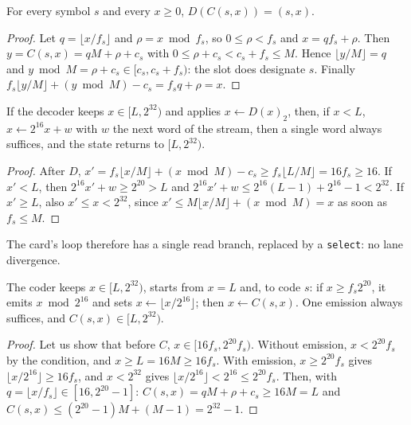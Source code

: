 \begin{lemme}[Inversion]\label{lem:rans-inversion}
For every symbol $s$ and every $x \ge 0$, $D(C(s,x)) = (s, x)$.
\end{lemme}

\begin{proof}
Let $q = \lfloor x/f_s \rfloor$ and $\rho = x \bmod f_s$, so $0 \le \rho < f_s$ and $x = q f_s + \rho$. Then $y = C(s,x) = qM + \rho + c_s$ with $0 \le \rho + c_s < c_s + f_s \le M$. Hence $\lfloor y/M \rfloor = q$ and $y \bmod M = \rho + c_s \in [c_s, c_s + f_s)$: the slot does designate $s$. Finally $f_s \lfloor y/M\rfloor + (y \bmod M) - c_s = f_s q + \rho = x$.
\end{proof}

\begin{lemme}\label{lem:rans-lecture}
If the decoder keeps $x \in [L, 2^{32})$ and applies $x \leftarrow D(x)_2$, then, if $x < L$, $x \leftarrow 2^{16} x + w$ with $w$ the next word of the stream, then a single word always suffices, and the state returns to $[L, 2^{32})$.
\end{lemme}

\begin{proof}
After $D$, $x' = f_s\lfloor x/M\rfloor + (x \bmod M) - c_s \ge f_s \lfloor L/M \rfloor = 16 f_s \ge 16$. If $x' < L$, then $2^{16}x' + w \ge 2^{20} > L$ and $2^{16} x' + w \le 2^{16}(L - 1) + 2^{16} - 1 < 2^{32}$. If $x' \ge L$, also $x' \le x < 2^{32}$, since $x' \le M\lfloor x/M\rfloor + (x \bmod M) = x$ as soon as $f_s \le M$.
\end{proof}

The card's loop therefore has a single read branch, replaced by a \texttt{select}: no lane divergence.

\begin{lemme}\label{lem:rans-codeur}
The coder keeps $x \in [L, 2^{32})$, starts from $x = L$ and, to code $s$: if $x \ge f_s 2^{20}$, it emits $x \bmod 2^{16}$ and sets $x \leftarrow \lfloor x/2^{16} \rfloor$; then $x \leftarrow C(s, x)$. One emission always suffices, and $C(s,x) \in [L, 2^{32})$.
\end{lemme}

\begin{proof}
Let us show that before $C$, $x \in [16 f_s, 2^{20} f_s)$. Without emission, $x < 2^{20} f_s$ by the condition, and $x \ge L = 16M \ge 16 f_s$. With emission, $x \ge 2^{20} f_s$ gives $\lfloor x/2^{16}\rfloor \ge 16 f_s$, and $x < 2^{32}$ gives $\lfloor x/2^{16}\rfloor < 2^{16} \le 2^{20} f_s$. Then, with $q = \lfloor x/f_s\rfloor \in [16, 2^{20} - 1]$: $C(s,x) = qM + \rho + c_s \ge 16 M = L$ and $C(s,x) \le (2^{20} - 1) M + (M - 1) = 2^{32} - 1$.
\end{proof}

